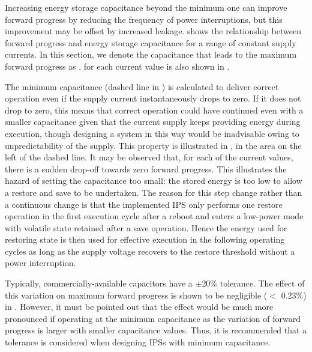 Increasing energy storage capacitance beyond the minimum one can improve forward progress by reducing the frequency of power interruptions, but this improvement may be offset by increased leakage. 
 shows the relationship between forward progress and energy storage capacitance for a range of constant supply currents. 
In this section, we denote the capacitance that leads to the maximum forward progress  as . 
 for each current value is also shown in .

The minimum capacitance (dashed line in ) is calculated to deliver correct operation even if the supply current instantaneously drops to zero. 
If it does not drop to zero, this means that correct operation could have continued even with a smaller capacitance given that the current supply keeps providing energy during execution, though designing a system in this way would be inadvisable owing to unpredictability of the supply. 
This property is illustrated in , in the area on the left of the dashed line. 
It may be observed that, for each of the current values, there is a sudden drop-off towards zero forward progress. 
This illustrates the hazard of setting the capacitance too small: the stored energy is too low to allow a restore and save to be undertaken.
The reason for this step change rather than a continuous change is that the implemented IPS only performs one restore operation in the first execution cycle after a reboot and enters a low-power mode with volatile state retained after a save operation. 
Hence the energy used for restoring state is then used for effective execution in the following operating cycles as long as the supply voltage recovers to the restore threshold without a power interruption.
 
Typically, commercially-available capacitors have a $\pm$20\% tolerance. 
The effect of this variation on maximum forward progress is shown to be negligible ($<$ 0.23\%) in . 
However, it must be pointed out that the effect would be much more pronounced if operating at the minimum capacitance as the variation of forward progress is larger with smaller capacitance values. 
Thus, it is recommended that a tolerance is considered when designing IPSs with minimum capacitance.

